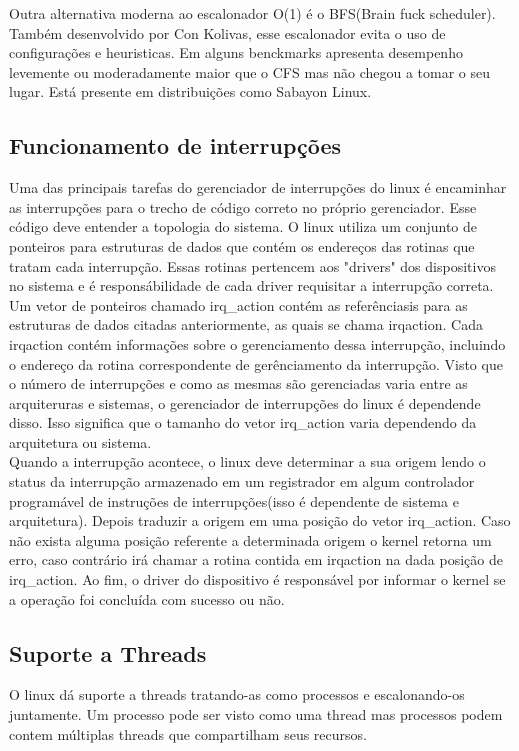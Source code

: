 \documentclass[conference]{IEEEtran}
\begin{document}
Outra alternativa moderna ao escalonador O(1) é o BFS(Brain fuck scheduler). Também desenvolvido por Con Kolivas, esse escalonador evita o uso de configurações e heuristicas. Em alguns benckmarks apresenta desempenho levemente ou moderadamente maior que o CFS mas não chegou a tomar o seu lugar. Está presente em distribuições como Sabayon Linux\cite{LinuxSchedulerBFS}.
\cite{LinuxSchedulerWiki}

\subsection{Funcionamento de interrupções}\label{sec:LinuxInt}
Uma das principais tarefas do gerenciador de interrupções do linux é encaminhar as interrupções para o trecho de código correto no próprio gerenciador. Esse código deve entender a topologia do sistema. O linux utiliza um conjunto de ponteiros para estruturas de dados que contém os endereços das rotinas que tratam cada interrupção. Essas rotinas pertencem aos "drivers" dos dispositivos no sistema e é responsábilidade de cada driver requisitar a interrupção correta. Um vetor de ponteiros chamado irq\_action contém as referênciasis para as estruturas de dados citadas anteriormente, as quais se chama irqaction. Cada irqaction contém informações sobre o gerenciamento dessa interrupção, incluindo o endereço da rotina correspondente de gerênciamento da interrupção. Visto que o número de interrupções e como as mesmas são gerenciadas varia entre as arquiteruras e sistemas, o gerenciador de interrupções do linux é dependende disso. Isso significa que o tamanho do vetor irq\_action varia dependendo da arquitetura ou sistema.\\

Quando a interrupção acontece, o linux deve determinar a sua origem lendo o status da interrupção armazenado em um registrador em algum controlador programável de instruções de interrupções(isso é dependente de sistema e arquitetura). Depois traduzir a origem em uma posição do vetor irq\_action. Caso não exista alguma posição referente a determinada origem o kernel retorna um erro, caso contrário irá chamar a rotina contida em irqaction na dada posição de irq\_action. Ao fim, o driver do dispositivo é responsável por informar o kernel se a operação foi concluída com sucesso ou não\cite{InterruptsLinux}.
\subsection{Suporte a Threads}\label{sec:LinuxThreads}
O linux dá suporte a threads tratando-as como processos e escalonando-os juntamente. Um processo pode ser visto como uma thread mas
processos podem contem múltiplas threads que compartilham seus recursos\cite{LinuxSchedulerIBM}.
\end{document}
